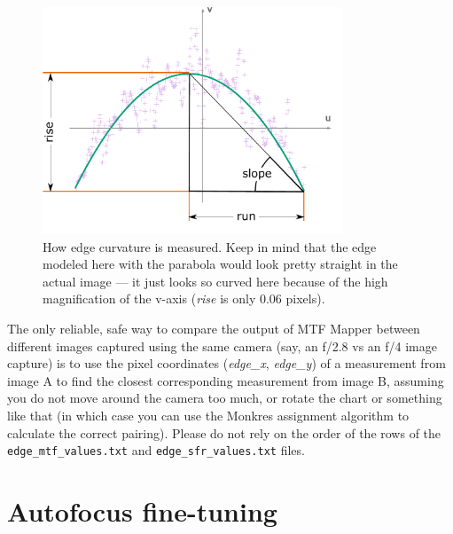 \documentclass[a4paper]{article}
\begin{document}
\begin{figure}[!hb]
\centering
\includegraphics[width=0.8\textwidth]{figures/line_deviation}
\caption{How edge curvature is measured. Keep in mind that the edge modeled
here with the parabola would look pretty straight in the actual image --- it
just looks so curved here because of the high magnification of the v-axis
(\emph{rise} is only 0.06 pixels).}
\label{fig:line_deviation}
\end{figure}

The only reliable, safe way to compare the output of MTF Mapper between
different images captured using the same camera (say, an f/2.8 vs an f/4
image capture) is to use the pixel coordinates (\emph{edge\_x},
\emph{edge\_y}) of a 
measurement from image A to find the closest corresponding measurement from
image B, assuming you do not move around the camera too much, or rotate the
chart or something like that (in which case you can use the Monkres
assignment algorithm to calculate the correct pairing). Please do not rely
on the order of the rows of the \texttt{edge\_mtf\_values.txt} and
\texttt{edge\_sfr\_values.txt} files.

\newpage

\section{Autofocus fine-tuning}
\label{sec:autofocus}
\end{document}
